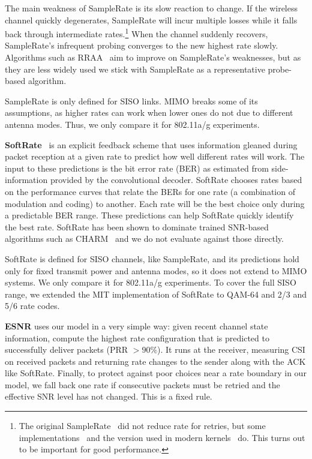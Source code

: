 The main weakness of SampleRate is its slow reaction to change. If the wireless channel quickly degenerates, SampleRate will incur multiple losses while it falls back through intermediate rates.\footnote{The original SampleRate~\cite{Bicket_SampleRate} did not reduce rate for retries, but some implementations~\cite{Judd_CHARM} and the version used in modern kernels~\cite{Minstrel} do. This turns out to be important for good performance.} When the channel suddenly recovers, SampleRate's infrequent probing converges to the new highest rate slowly. Algorithms such as 
RRAA~\cite{Wong_RRAA} aim to improve on SampleRate's weaknesses, but as they are less widely used we stick with SampleRate as a representative probe-based algorithm.

SampleRate is only defined for SISO links. MIMO breaks some of its assumptions, as higher rates can work when lower ones do not due to different antenna modes. Thus, we only compare it for 802.11a/g experiments. 

\textbf{SoftRate}~\cite{Vutukuru_SoftRate} is an explicit feedback scheme that uses information gleaned during packet reception at a given rate to predict how well different rates will work. The input to these predictions is the bit error rate (BER) as estimated from side-information provided by the convolutional decoder. SoftRate chooses rates based on the performance curves that relate the BERs for one rate (a combination of modulation and coding) to another. %
Each rate will be the best choice only during a predictable BER range. These predictions can help SoftRate quickly identify the best rate. SoftRate has been shown to dominate trained SNR-based algorithms such as CHARM~\cite{Judd_CHARM} and we do not evaluate against those directly.


SoftRate is defined for SISO channels, like SampleRate, 
and its predictions hold only for fixed transmit power and antenna modes, so it does not extend to MIMO systems.
We only compare it for 802.11a/g experiments. 
To cover the full SISO range, we extended the MIT implementation of SoftRate to QAM-64 and 2/3 and 5/6 rate codes.

\textbf{ESNR} uses our model in a very simple way: given recent channel state information, compute the highest rate configuration that is predicted to successfully deliver packets (PRR $>90\%$). It runs at the receiver, measuring CSI on received packets and returning rate changes to the sender along with the ACK like SoftRate. Finally, to protect against poor choices near a rate boundary in our model, we fall back one rate if consecutive packets must be retried and the effective SNR level has not changed. This is a fixed rule.


